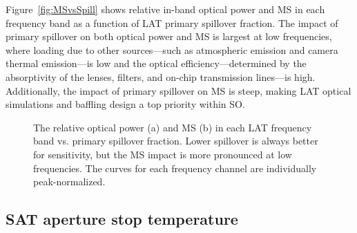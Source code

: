 Figure~\ref{fig:MSvsSpill} shows relative in-band optical power and MS in each frequency band as a function of LAT primary spillover fraction. The impact of primary spillover on both optical power and MS is largest at low frequencies, where loading due to other sources---such as atmospheric emission and camera thermal emission---is low and the optical efficiency---determined by the absorptivity of the lenses, filters, and on-chip transmission lines---is high. Additionally, the impact of primary spillover on MS is steep, making LAT optical simulations and baffling design a top priority within SO.

\begin{figure}[!t]
    \hfill
    \caption[Impact of SO LAT primary spillover on optical power and mapping speed]{The relative optical power (a) and MS (b) in each LAT frequency band vs. primary spillover fraction. Lower spillover is always better for sensitivity, but the MS impact is more pronounced at low frequencies. The curves for each frequency channel are individually peak-normalized.}
    \label{fig:so_primary_spillover}
\end{figure}


\subsection{SAT aperture stop temperature}
\label{sec:bolocalc_sat_stop_temperature}

